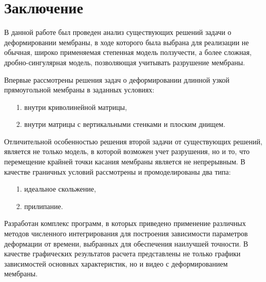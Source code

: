 \chapter*{Заключение}
В данной работе был проведен анализ существующих решений задачи о деформировании 
мембраны, в ходе которого была выбрана для реализации не обычная, широко применяемая 
степенная модель ползучести, а более сложная, дробно-сингулярная модель, позволяющая 
учитывать разрушение мембраны.

Впервые рассмотрены решения задач о деформировании длинной узкой прямоугольной мембраны в заданных условиях:
\begin{itemize}
\item[1.] внутри криволинейной матрицы,
\item[2.] внутри матрицы с вертикальными стенками и плоским днищем.
\end{itemize}
Отличительной особенностью решения второй задачи от существующих решений, является
не только модель, в которой возможен учет разрушения, но и то, что перемещение крайней точки касания мембраны является не непрерывным. В качестве граничных условий
рассмотрены и промоделированы два типа:
\begin{itemize}
\item[1.] идеальное скольжение,
\item[2.] прилипание.
\end{itemize}

Разработан комплекс программ, в которых приведено применение  различных методов 
численного интегрирования для построения зависимости параметров деформации от времени, 
выбранных для обеспечения наилучшей точности. В качестве графических результатов 
расчета представлены не только графики зависимостей основных характеристик, но и видео 
с деформированием мембраны.
